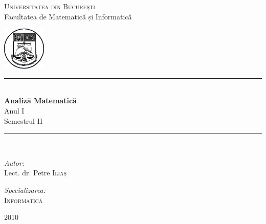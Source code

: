 \begin{titlepage}

\vspace{20pt}

\begin{center} \Large
\textsc{Universitatea din București} \\
Facultatea de Matematică și Informatică
\end{center}

\begin{center}


\vspace{10pt}
\includegraphics[scale=0.37]{./logo.png}\\[1cm]    
\newcommand{\HRule}{\rule{\linewidth}{0.5mm}}



\HRule \\[0.4cm]

\vfill
{
	\Huge \textbf {Analiză Matematică} \\
		\vspace{30pt}
	\huge Anul I \\
		\vspace{30pt}
	\huge Semestrul II
}\\[0.19cm]
\vfill

\HRule \\[1.5cm]

\begin{minipage}{0.4\textwidth}
\begin{flushleft} \large
\emph{Autor:}\\
Lect. dr. Petre \textsc{Iliaș}
\end{flushleft}
\end{minipage}
\begin{minipage}{0.4\textwidth}
\begin{flushright}
\emph{Specializarea:}\\
\textsc{Informatică}
\end{flushright}
\end{minipage}


{\large 2010}

\end{center}

\end{titlepage}
